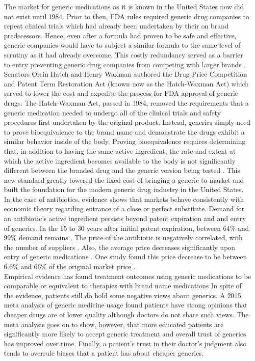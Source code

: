 \indent The market for generic medications as it is known in the United States now did not exist until 1984. Prior to then, FDA rules required generic drug companies to repeat clinical trials which had already been undertaken by their on brand predecessors. Hence, even after a formula had proven to be safe and effective, generic companies would have to subject a similar formula to the same level of scrutiny as it had already overcome. This costly redundancy served as a barrier to entry preventing generic drug companies from competing with larger brands \cite{eban_bottle_2019}.\\
\indent Senators Orrin Hatch and Henry Waxman authored the Drug Price Competition and Patent Term Restoration Act (known now as the Hatch-Waxman Act) which served to lower the cost and expedite the process for FDA approval of generic drugs. The Hatch-Waxman Act, passed in 1984, removed the requirements that a generic medication needed to undergo all of the clinical trials and safety procedures first undertaken by the original product. Instead, generics simply need to prove bioequivalence to the brand name and demonstrate the drugs exhibit a similar behavior inside of the body. Proving bioequivalence requires determining that, in addition to having the same active ingredient, the rate and extent at which the active ingredient becomes available to the body is not significantly different between the branded drug and the generic version being tested \cite{fda_primer}. This new standard greatly lowered the fixed cost of bringing a generic to market and built the foundation for the modern generic drug industry in the United States.\\
\indent In the case of antibiotics, evidence shows that markets behave consistently with economic theory regarding entrance of a close or perfect substitute. Demand for an antibiotic's active ingredient persists beyond patent expiration and and entry of generics. In the 15 to 30 years after initial patent expiration, between 64\% and 99\% demand remains \cite{mansley_utilization_2008}. The price of the antibiotic is negatively correlated, with the number of suppliers \cite{alpern_trends_2017}. Also, the average price decreases significantly upon entry of generic medications \cite{frank_generic_1997, grabowski_brand_1992}. One study found this price decrease to be between 6.6\% and 66\% of the original market price \cite{vondeling_impact_2018}.\\
\indent Empirical evidence has found treatment outcomes using generic medications to be comparable or equivalent to therapies with brand name medications \cite{lin_comparative_2017,desai_comparative_2019} In spite of the evidence, patients still do hold some negative views about generics. A 2015 meta analysis of generic medicine usage found patients have strong opinions that cheaper drugs are of lower quality although doctors do not share such views\cite{dunne_what_2015}. The meta analysis goes on to show, however, that more educated patients are significantly more likely to accept generic treatment and overall trust of generics has improved over time. Finally, a patient's trust in their doctor's judgment also tends to overrule biases that a patient has about cheaper generics.\\

